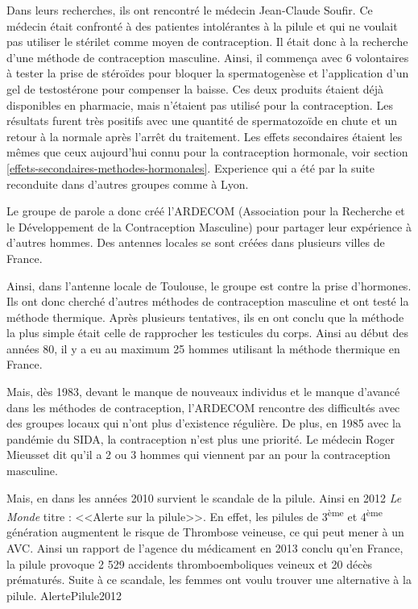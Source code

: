 \documentclass[12pt,a4paper]{report}
\begin{document}
Dans leurs recherches, ils ont rencontré le médecin Jean-Claude Soufir. \cite{guillaumedaudinContraceptesEnqueteDernier2022}\cite{HistoriqueArdecom}
Ce médecin était confronté à des patientes intolérantes à la pilule et qui ne voulait pas utiliser le stérilet comme moyen de contraception.
Il était donc à la recherche d'une méthode de contraception masculine.
Ainsi, il commença avec 6 volontaires à tester la prise de stéroïdes pour bloquer la spermatogenèse et l'application d'un gel de testostérone pour compenser la baisse.
Ces deux produits étaient déjà disponibles en pharmacie, mais n'étaient pas utilisé pour la contraception. \cite{soufirReversibleInhibitionSperm1983}\cite{bobikaCoeurZobs2022}
Les résultats furent très positifs avec une quantité de spermatozoïde en chute et un retour à la normale après l'arrêt du traitement.
Les effets secondaires étaient les mêmes que ceux aujourd'hui connu pour la contraception hormonale, voir section \ref{effets-secondaires-methodes-hormonales}. \cite{soufirReversibleInhibitionSperm1983}
Experience qui a été par la suite reconduite dans d'autres groupes comme à Lyon. \cite{ContraceptionSeDecline1982}

Le groupe de parole a donc créé l'ARDECOM (Association pour la Recherche et le Développement de la Contraception Masculine) pour partager leur expérience à d'autres hommes.
Des antennes locales se sont créées dans plusieurs villes de France. \cite{HistoriqueArdecom}\cite{guillaumedaudinContraceptesEnqueteDernier2022}

Ainsi, dans l'antenne locale de Toulouse, le groupe est contre la prise d'hormones.
Ils ont donc cherché d'autres méthodes de contraception masculine et ont testé la méthode thermique.
Après plusieurs tentatives, ils en ont conclu que la méthode la plus simple était celle de rapprocher les testicules du corps. \cite{bobikaCoeurZobs2022}
Ainsi au début des années 80, il y a eu au maximum 25 hommes utilisant la méthode thermique en France. \cite{guillaumedaudinContraceptesEnqueteDernier2022}

Mais, dès 1983, devant le manque de nouveaux individus et le manque d'avancé dans les méthodes de contraception, l'ARDECOM rencontre des difficultés avec des groupes locaux qui n'ont plus d'existence régulière.
De plus, en 1985 avec la pandémie du SIDA, la contraception n'est plus une priorité.
Le médecin Roger Mieusset dit qu'il a 2 ou 3 hommes qui viennent par an pour la contraception masculine. \cite{guillaumedaudinContraceptesEnqueteDernier2022}

Mais, en dans les années 2010 survient le scandale de la pilule. Ainsi en 2012 \textit{Le Monde} titre : <<Alerte sur la pilule>>.
En effet, les pilules de 3\textsuperscript{ème} et 4\textsuperscript{ème} génération augmentent le risque de Thrombose veineuse, ce qui peut mener à un AVC.
Ainsi un rapport de l'agence du médicament en 2013 conclu qu'en France, la pilule provoque 2 529 accidents thromboemboliques veineux et 20 décès prématurés.
Suite à ce scandale, les femmes ont voulu trouver une alternative à la pilule. \cite{albrechtQuelleEstPlace2023}\cite{guillaumedaudinContraceptesEnqueteDernier2022}{AlertePilule2012}
\end{document}
